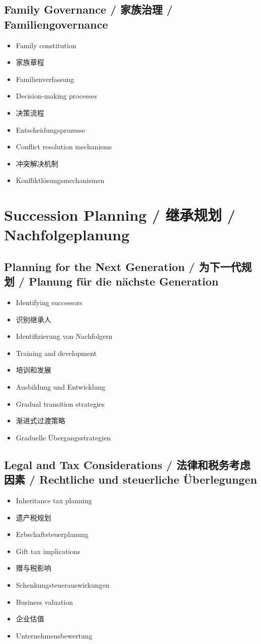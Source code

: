 \subsection{Family Governance / 家族治理 / Familiengovernance}
\begin{itemize}
    \item Family constitution
    \item 家族章程
    \item Familienverfassung
    \item Decision-making processes
    \item 决策流程
    \item Entscheidungsprozesse
    \item Conflict resolution mechanisms
    \item 冲突解决机制
    \item Konfliktlösungsmechanismen
\end{itemize}

\section{Succession Planning / 继承规划 / Nachfolgeplanung}

\subsection{Planning for the Next Generation / 为下一代规划 / Planung für die nächste Generation}
\begin{itemize}
    \item Identifying successors
    \item 识别继承人
    \item Identifizierung von Nachfolgern
    \item Training and development
    \item 培训和发展
    \item Ausbildung und Entwicklung
    \item Gradual transition strategies
    \item 渐进式过渡策略
    \item Graduelle Übergangsstrategien
\end{itemize}

\subsection{Legal and Tax Considerations / 法律和税务考虑因素 / Rechtliche und steuerliche Überlegungen}
\begin{itemize}
    \item Inheritance tax planning
    \item 遗产税规划
    \item Erbschaftsteuerplanung
    \item Gift tax implications
    \item 赠与税影响
    \item Schenkungsteuerauswirkungen
    \item Business valuation
    \item 企业估值
    \item Unternehmensbewertung
\end{itemize}

